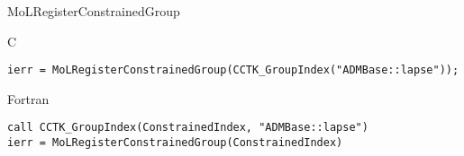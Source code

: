\begin{FunctionDescription}{MoLRegisterConstrainedGroup}
  \begin{ExampleSection}
    \begin{Example}{C}
\begin{verbatim}
ierr = MoLRegisterConstrainedGroup(CCTK_GroupIndex("ADMBase::lapse"));
\end{verbatim}
    \end{Example}
    \begin{Example}{Fortran}
\begin{verbatim}
call CCTK_GroupIndex(ConstrainedIndex, "ADMBase::lapse")
ierr = MoLRegisterConstrainedGroup(ConstrainedIndex)
\end{verbatim}
    \end{Example}
  \end{ExampleSection}

\end{FunctionDescription}



